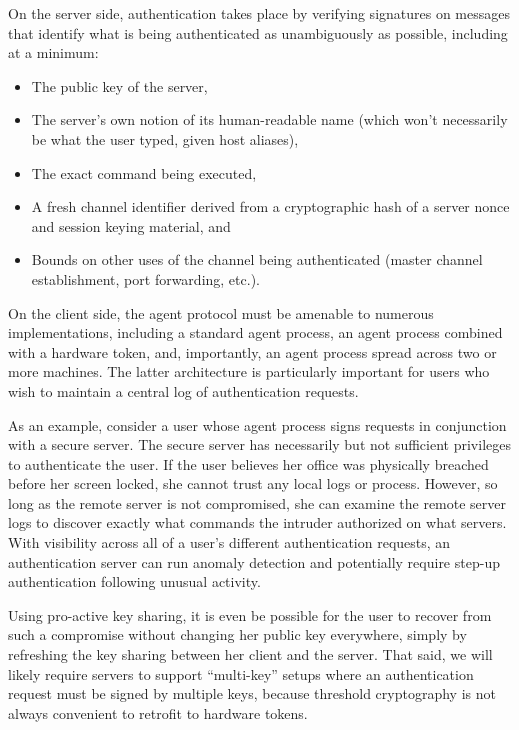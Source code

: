 \documentclass[11pt]{article}
\begin{document}
On the server side, authentication takes place by verifying signatures
on messages that identify what is being authenticated as unambiguously
as possible, including at a minimum:
\begin{itemize}\itemsep=0pt
\item The public key of the server,
\item The server's own notion of its human-readable name (which won't
  necessarily be what the user typed, given host aliases),
\item The exact command being executed,
\item A fresh channel identifier derived from a cryptographic hash of
  a server nonce and session keying material, and
\item Bounds on other uses of the channel being authenticated (master
  channel establishment, port forwarding, etc.).
\end{itemize}

On the client side, the agent protocol must be amenable to numerous
implementations, including a standard agent process, an agent process
combined with a hardware token, and, importantly, an agent process
spread across two or more machines.  The latter architecture is
particularly important for users who wish to maintain a central log of
authentication requests.

As an example, consider a user whose agent process signs requests in
conjunction with a secure server.  The secure server has necessarily
but not sufficient privileges to authenticate the user.  If the user
believes her office was physically breached before her screen locked,
she cannot trust any local logs or process.  However, so long as the
remote server is not compromised, she can examine the remote server
logs to discover exactly what commands the intruder authorized on what
servers.  With visibility across all of a user's different
authentication requests, an authentication server can run anomaly
detection and potentially require step-up authentication following
unusual activity.

Using pro-active key sharing, it is even be possible for the user to
recover from such a compromise without changing her public key
everywhere, simply by refreshing the key sharing between her client
and the server.  That said, we will likely require servers to support
``multi-key'' setups where an authentication request must be signed by
multiple keys, because threshold cryptography is not always convenient
to retrofit to hardware tokens.
\end{document}
